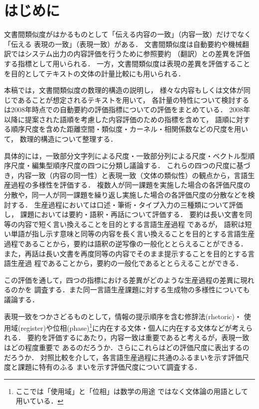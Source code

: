 \documentclass[japanese]{jnlp_1.4}
\newcommand{\modified}[1]{}
\begin{document}
\maketitle


\section{はじめに}

文書間類似度がはかるものとして「伝える内容の一致」（内容一致）だけでなく「伝える
表現の一致」（表現一致）がある．
文書間類似度は自動要約や機械翻訳ではシステム出力の内容評価を行うために参照要約
（翻訳）との差異を評価する指標として用いられる．
一方，文書間類似度は表現の差異を評価することを目的としてテキストの文体の計量比較にも用いられる．

本稿では，文書間類似度の数理的構造の説明し，
様々な内容もしくは文体が同じであることが想定されるテキストを用いて，
各計量の特性について検討する\modified{．}
\cite{nanba-hirao-2008-JSAI-journal}は2008年時点での自動要約の評価指標についての評価をまとめている．
2008年以降に提案された語順を考慮した内容評価のための指標を含めて，
語順に対する順序尺度を含めた距離空間・類似度・カーネル・相関係数などの尺度を用い
て，
数理的構造について整理する．

具体的には，一致部分文字列による尺度・一致部分列による尺度・ベクトル型順序尺度・編集型順序尺度の四つに分類し議論する．
これらの四つの尺度に基づき，内容一致（内容の同一性）と表現一致（文体の類似性）の観点から，言語生産過程の多様性を評価する．
複数人が同一課題を実施した場合の各評価尺度の分散や，同一人が同一課題を繰り返し実施した場合の各評価尺度の分散などを検討する．
生産過程においては口述・筆術・タイプ入力の三種類について評価し，
課題においては要約・語釈・再話について評価する．
要約は長い文書を同等の内容で短く言い換えることを目的とする言語生産過程
であるが，
語釈は短い単語が指し示す意味と同等の内容を長く言い換えることを目的とする言語生産
過程であることから，要約は語釈の逆写像の一般化ととらえることができる．
また，再話は長い文書を再度同等の内容でそのまま提示することを目的とする言語生産過
程であることから，要約の一般化であるととらえることができる．

この評価を通して，四つの指標における差異がどのような生産過程の差異に現れるのかを
調査する．また同一言語生産課題に対する生成物の多様性についても議論する．

表現一致をつかさどるものとして，情報の提示順序を含む修辞法(rhetoric)・
使用域(register)や位相(phase)\footnote{ここでは「使用域」と「位相」は数学の用途
ではなく文体論の用語として用いている．}に内在する文体・個人に内在する文体などが考えられる．
要約を評価するにあたり，内容一致は重要であると考えるが，表現一致はどの程度重要で
あるのだろうか．さらにこれらはどの評価尺度に表出するのだろうか．
対照比較を介して，各言語生産過程に共通のふるまいを示す評価尺度と課題に特有のふる
まいを示す評価尺度について調査する．
\end{document}
